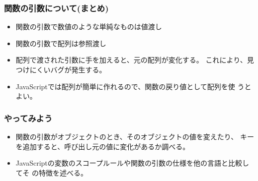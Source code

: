 \begin{frame}[containsverbatim]
 \frametitle{関数の引数について(まとめ)}
 \begin{itemize}
	\item 関数の引数で数値のような単純なものは値渡し
	\item 関数の引数で配列は参照渡し
	\item 配列で渡された引数に手を加えると、元の配列が変化する。
				これにより、見つけにくいバグが発生する。
	\item JavaScriptでは配列が簡単に作れるので、関数の戻り値として配列を使
				うとよい。
 \end{itemize}
\end{frame}
\begin{frame}[containsverbatim]
 \frametitle{やってみよう}
 \begin{itemize}
	\item 関数の引数がオブジェクトのとき、そのオブジェクトの値を変えたり、
				キーを追加すると、呼び出し元の値に変化があるか調べる。
	\item JavaScriptの変数のスコープルールや関数の引数の仕様を他の言語と比較してそ
 の特徴を述べる。
 \end{itemize}

\end{frame}


\begin{frame}[containsverbatim]
 \frametitle{}
\end{frame}
